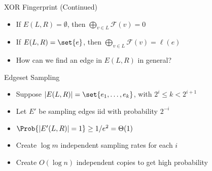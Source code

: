 \documentclass[aspectratio=169, handout]{beamer}
\renewcommand{\F}{\mathcal{F}}
\begin{document}
\begin{frame}{XOR Fingerprint (Continued)}
    \begin{itemize}
        \item If $E(L, R) = \emptyset$, then $\bigoplus_{v \in L} \F(v) = 0$
              \pause
        \item If $E(L, R) = \set{e}$, then $\bigoplus_{v \in L} \F(v) = \ell(e)$
              \pause
        \item How can we find an edge in $E(L, R)$ in general?
              \pause
    \end{itemize}
\end{frame}

\begin{frame}{Edgeset Sampling}
    \begin{itemize}
        \item Suppose $|E(L, R)| = \set{e_1, \ldots, e_k}$, with $2^i \le k < 2^{i+1}$
              \pause
        \item Let $E'$ be sampling edges iid with probability $2^{-i}$
              \pause
        \item $\Prob{|E'(L, R)| = 1} \ge 1/e^2 = \Theta(1)$
              \pause
              \pause
        \item Create $\log m$ independent sampling rates for each $i$
              \pause
        \item Create $O(\log n)$ independent copies to get high probability
    \end{itemize}
\end{frame}
\end{document}
